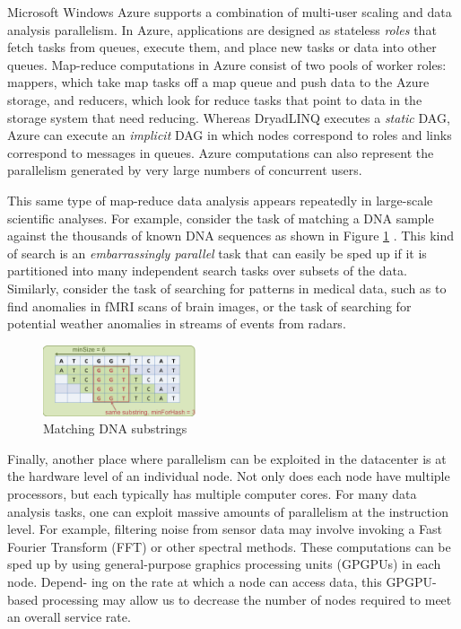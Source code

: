 \documentclass[twocolumn]{article}
\begin{document}
Microsoft Windows Azure supports a combination of multi-user scaling and data analysis parallelism. In Azure, applications are designed as stateless \emph{roles} that fetch tasks from queues, execute them, and place new tasks or data into other queues. Map-reduce computations in Azure consist of two pools of worker roles: mappers, which take map tasks off a map queue and push data to the Azure storage, and reducers, which look for reduce tasks that point to data in the storage system that need reducing. Whereas DryadLINQ executes a \emph{static} DAG, Azure can execute an \emph{implicit} DAG in which nodes correspond to roles and links correspond to messages in queues. Azure computations can also represent the parallelism generated by very large numbers of concurrent users.

This same type of map-reduce data analysis appears repeatedly in large-scale scientific analyses. For example, consider the task of matching a DNA sample against the thousands of known DNA sequences as shown in Figure \ref{DNA} . This kind of search is an \emph{embarrassingly parallel} task that can easily be sped up if it is partitioned into many independent search tasks over subsets of the data. Similarly, consider the task of searching for patterns in medical data, such as to find anomalies in fMRI scans of brain images, or the task of searching for potential weather anomalies in streams of events from radars.
\begin{figure}[htb]
	\centering
	\includegraphics[width=0.4\textwidth]{matchingDNA}
	\caption{Matching DNA substrings}
	\label{DNA}
\end{figure}

Finally, another place where parallelism can be exploited in the datacenter is at the hardware level of an individual node. Not only does each node have multiple processors, but each typically has multiple computer cores. For many data analysis tasks, one can exploit massive amounts of parallelism at the instruction level. For example, filtering noise from sensor data may involve invoking a Fast Fourier Transform (FFT) or other spectral methods. These computations can be sped up by using general-purpose graphics processing units (GPGPUs) in each node. Depend- ing on the rate at which a node can access data, this GPGPU-based processing may allow us to decrease the number of nodes required to meet an overall service rate.
\end{document}
